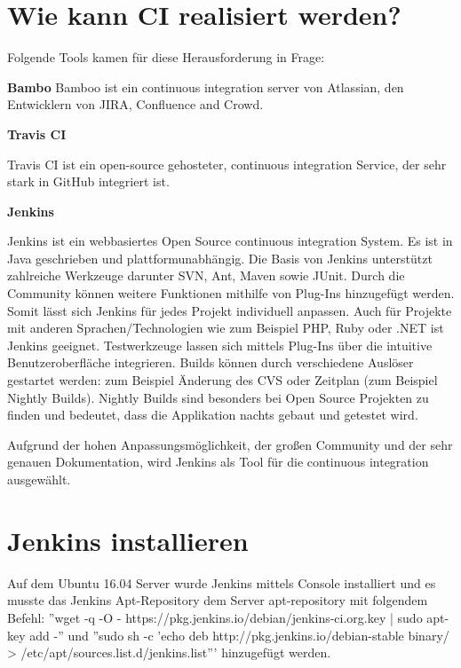 \section{Wie kann CI realisiert werden?}\label{sec:whyci}
Folgende Tools kamen für diese Herausforderung in Frage:

\textbf{Bambo}
Bamboo ist ein continuous integration server von Atlassian, den Entwicklern von JIRA, Confluence and Crowd. 

\textbf{Travis CI}

Travis CI ist ein open-source gehosteter, continuous integration Service, der sehr stark in  GitHub integriert ist.

\textbf{Jenkins}

Jenkins ist ein webbasiertes Open Source continuous integration System. Es ist in Java geschrieben und plattformunabhängig. Die Basis von Jenkins unterstützt zahlreiche Werkzeuge darunter SVN, Ant, Maven sowie JUnit. Durch die Community können weitere Funktionen mithilfe von Plug-Ins hinzugefügt werden. Somit lässt sich Jenkins für jedes Projekt individuell anpassen. Auch für Projekte mit anderen Sprachen/Technologien wie zum Beispiel PHP, Ruby oder .NET ist Jenkins geeignet. Testwerkzeuge lassen sich mittels Plug-Ins über die intuitive Benutzeroberfläche integrieren. Builds können durch verschiedene Auslöser gestartet werden: zum Beispiel Änderung des CVS oder Zeitplan (zum Beispiel Nightly Builds). Nightly Builds sind besonders bei Open Source Projekten zu finden und bedeutet, dass die Applikation nachts gebaut und getestet wird.

Aufgrund der hohen Anpassungsmöglichkeit, der großen Community und der sehr genauen Dokumentation, wird Jenkins als Tool für die continuous integration ausgewählt.

\section{Jenkins installieren}
\label{sec:jenkinsinstallation}
Auf dem Ubuntu 16.04 Server wurde Jenkins mittels Console installiert und es musste das Jenkins Apt-Repository dem Server apt-repository mit folgendem Befehl: ''wget -q -O - https://pkg.jenkins.io/debian/jenkins-ci.org.key | sudo apt-key add -'' und 
''sudo sh -c 'echo deb http://pkg.jenkins.io/debian-stable binary/ > /etc/apt/sources.list.d/jenkins.list''' hinzugefügt werden.

